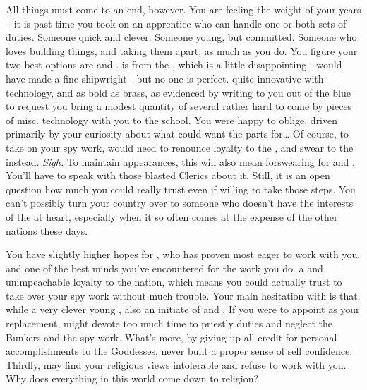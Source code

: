 \documentclass[char]{GL2020}
\begin{document}
All things must come to an end, however. You are feeling the weight of your years -- it is past time you took on an apprentice who can handle one or both sets of duties. Someone quick and clever. Someone young, but committed. Someone who loves building things, and taking them apart, as much as you do. You figure your two best options are \cTechStar{\full} and \cInitiate{\full}. \cTechStar{} is from the \pTech{}, which is a little disappointing - \cTechStar{\they} would have made a fine shipwright - but no one is perfect. \cTechStar{\They} \cTechStar{\are} quite innovative with technology, and as bold as brass, as evidenced by \cTechStar{\their} writing to you out of the blue to request you bring a modest quantity of several rather hard to come by pieces of misc. technology with you to the school. You were happy to oblige, driven primarily by your curiosity about what \cTechStar{\they} could want the parts for\ldots{} Of course, to take on your spy work, \cTechStar{} would need to renounce loyalty to the \pTech{}, and swear to the \pShip{} instead. \emph{Sigh.} To maintain appearances, this will also mean forswearing \cTechGod{} for \cEbb{} and \cFlow{}. You'll have to speak with those blasted Clerics about it. Still, it is an open question how much you could really trust \cTechStar{} even if \cTechStar{\theyare} willing to take those steps. You can't possibly turn your country over to someone who doesn't have the interests of the \pShip{} at heart, especially when it so often comes at the expense of the other nations these days.

You have slightly higher hopes for \cInitiate{}, who has proven most eager to work with you, and \cInitiate{\they} \cInitiate{\have} one of the best minds you've encountered for the work you do. \cInitiate{\Theyare} a \pShippie{} and \cInitiate{\have} unimpeachable loyalty to the nation, which means you could actually trust \cInitiate{\them} to take over your spy work without much trouble. Your main hesitation with \cInitiate{} is that, while \cInitiate{\theyare} a very clever young \cInitiate{\person}, \cInitiate{\theyare} also an initiate of \cEbb{} and \cFlow{}. If you were to appoint \cInitiate{\them} as your replacement, \cInitiate{\they} might devote too much time to \cInitiate{\their} priestly duties and neglect the Bunkers and the spy work. What's more, by giving up all credit for personal accomplishments to the Goddesses, \cInitiate{\they} \cInitiate{\have} never built a proper sense of self confidence. Thirdly, \cInitiate{} may find your religious views intolerable and refuse to work with you. Why does everything in this world come down to religion?
\end{document}
